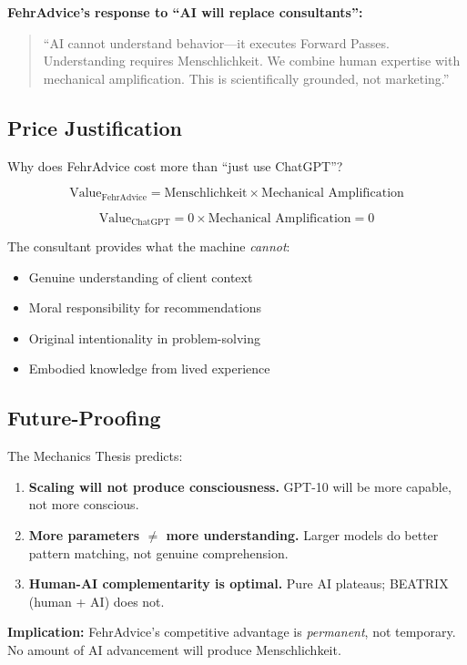\textbf{FehrAdvice's response to ``AI will replace consultants'':}
\begin{quote}
``AI cannot understand behavior---it executes Forward Passes. Understanding requires Menschlichkeit. We combine human expertise with mechanical amplification. This is scientifically grounded, not marketing.''
\end{quote}

\subsection{Price Justification}

Why does FehrAdvice cost more than ``just use ChatGPT''?

\begin{equation}
\text{Value}_{\text{FehrAdvice}} = \text{Menschlichkeit} \times \text{Mechanical Amplification}
\end{equation}

\begin{equation}
\text{Value}_{\text{ChatGPT}} = 0 \times \text{Mechanical Amplification} = 0
\end{equation}

The consultant provides what the machine \textit{cannot}:
\begin{itemize}[nosep]
    \item Genuine understanding of client context
    \item Moral responsibility for recommendations
    \item Original intentionality in problem-solving
    \item Embodied knowledge from lived experience
\end{itemize}

\subsection{Future-Proofing}

\begin{tcolorbox}[colback=green!5!white, colframe=green!75!black,
    title=\textbf{Why GPT-10 Won't Replace FehrAdvice}]

The Mechanics Thesis predicts:
\begin{enumerate}
    \item \textbf{Scaling will not produce consciousness.} GPT-10 will be more capable, not more conscious.
    \item \textbf{More parameters $\neq$ more understanding.} Larger models do better pattern matching, not genuine comprehension.
    \item \textbf{Human-AI complementarity is optimal.} Pure AI plateaus; BEATRIX (human + AI) does not.
\end{enumerate}

\textbf{Implication:} FehrAdvice's competitive advantage is \textit{permanent}, not temporary. No amount of AI advancement will produce Menschlichkeit.
\end{tcolorbox}

